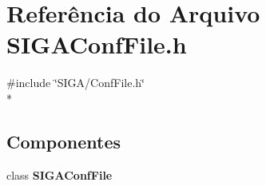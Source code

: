 \section{Referência do Arquivo S\+I\+G\+A\+Conf\+File.\+h}
\label{_s_i_g_a_conf_file_8h}
{\ttfamily \#include \char`\"{}S\+I\+G\+A/\+Conf\+File.\+h\char`\"{}}\\*
\subsection*{Componentes}
\begin{DoxyCompactItemize}
\item 
class {\bf S\+I\+G\+A\+Conf\+File}
\end{DoxyCompactItemize}
